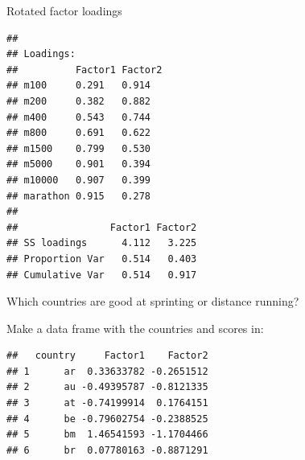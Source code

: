 \documentclass[ignorenonframetext,]{beamer}
\newenvironment{Shaded}{\begin{snugshade}}{\end{snugshade}}
\newcommand{\DataTypeTok}[1]{\textcolor[rgb]{0.13,0.29,0.53}{#1}}
\newcommand{\DecValTok}[1]{\textcolor[rgb]{0.00,0.00,0.81}{#1}}
\newcommand{\KeywordTok}[1]{\textcolor[rgb]{0.13,0.29,0.53}{\textbf{#1}}}
\newcommand{\NormalTok}[1]{#1}
\newcommand{\OperatorTok}[1]{\textcolor[rgb]{0.81,0.36,0.00}{\textbf{#1}}}
\newcommand{\StringTok}[1]{\textcolor[rgb]{0.31,0.60,0.02}{#1}}
\begin{document}
\begin{frame}[fragile]{Rotated factor loadings}
\protect\hypertarget{rotated-factor-loadings}{}

\small

\begin{Shaded}
\end{Shaded}

\begin{verbatim}
## 
## Loadings:
##          Factor1 Factor2
## m100     0.291   0.914  
## m200     0.382   0.882  
## m400     0.543   0.744  
## m800     0.691   0.622  
## m1500    0.799   0.530  
## m5000    0.901   0.394  
## m10000   0.907   0.399  
## marathon 0.915   0.278  
## 
##                Factor1 Factor2
## SS loadings      4.112   3.225
## Proportion Var   0.514   0.403
## Cumulative Var   0.514   0.917
\end{verbatim}

\normalsize

\end{frame}

\begin{frame}[fragile]{Which countries are good at sprinting or distance
running?}
\protect\hypertarget{which-countries-are-good-at-sprinting-or-distance-running}{}

Make a data frame with the countries and scores in:

\begin{Shaded}
\end{Shaded}

\begin{verbatim}
##   country     Factor1    Factor2
## 1      ar  0.33633782 -0.2651512
## 2      au -0.49395787 -0.8121335
## 3      at -0.74199914  0.1764151
## 4      be -0.79602754 -0.2388525
## 5      bm  1.46541593 -1.1704466
## 6      br  0.07780163 -0.8871291
\end{verbatim}

\end{frame}
\end{document}
